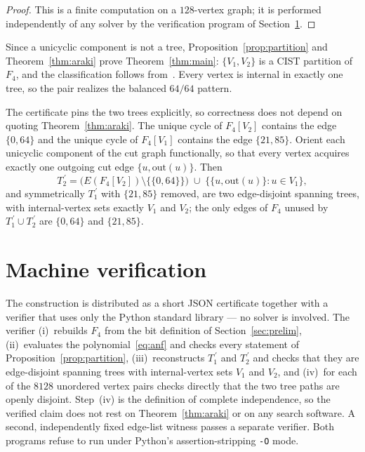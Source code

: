 \documentclass[11pt]{article}
\theoremstyle{remark}
\begin{document}
\begin{proof}
This is a finite computation on a $128$-vertex graph; it is performed
independently of any solver by the verification program of
Section~\ref{sec:verification}.
\end{proof}

Since a unicyclic component is not a tree, Proposition~\ref{prop:partition}
and Theorem~\ref{thm:araki} prove Theorem~\ref{thm:main}: $\{V_1,V_2\}$ is
a CIST partition of $F_4$, and the classification follows
from~\cite{Lalou2026}. Every vertex is internal in exactly one tree, so the
pair realizes the balanced $64/64$ pattern.

The certificate pins the two trees explicitly, so correctness does not
depend on quoting Theorem~\ref{thm:araki}. The unique cycle of $F_4[V_2]$
contains the edge $\{0,64\}$ and the unique cycle of $F_4[V_1]$ contains
the edge $\{21,85\}$. Orient each unicyclic component of the cut graph
functionally, so that every vertex acquires exactly one outgoing cut edge
$\{u,\mathrm{out}(u)\}$. Then
\[
T_2^{\,\prime} = \bigl(E(F_4[V_2])\setminus\{\{0,64\}\}\bigr)\;\cup\;
\bigl\{\{u,\mathrm{out}(u)\} : u\in V_1\bigr\},
\]
and symmetrically $T_1^{\,\prime}$ with $\{21,85\}$ removed, are two
edge-disjoint spanning trees, with internal-vertex sets exactly $V_1$ and
$V_2$; the only edges of $F_4$ unused by $T_1^{\,\prime}\cup
T_2^{\,\prime}$ are $\{0,64\}$ and $\{21,85\}$.

\section{Machine verification}\label{sec:verification}

The construction is distributed as a short JSON certificate together with a
verifier that uses only the Python standard library --- no solver is
involved. The verifier (i)~rebuilds $F_4$ from the bit definition of
Section~\ref{sec:prelim}, (ii)~evaluates the polynomial~\eqref{eq:anf} and
checks every statement of Proposition~\ref{prop:partition},
(iii)~reconstructs $T_1^{\,\prime}$ and $T_2^{\,\prime}$ and checks that
they are edge-disjoint spanning trees with internal-vertex sets $V_1$ and
$V_2$, and (iv)~for each of the $8128$ unordered vertex pairs checks
directly that the two tree paths are openly disjoint. Step~(iv) is the
definition of complete independence, so the verified claim does not rest on
Theorem~\ref{thm:araki} or on any search software. A second, independently
fixed edge-list witness passes a separate verifier. Both programs refuse to
run under Python's assertion-stripping \texttt{-O} mode.
\end{document}
